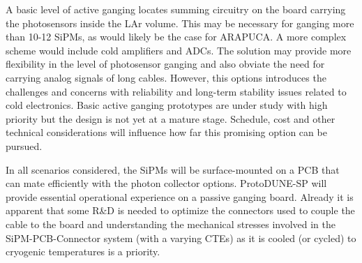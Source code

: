 A basic level of active ganging locates summing circuitry on the board carrying the photosensors inside the LAr volume. This may be necessary for ganging more than 10-12 SiPMs, as would likely be the case for ARAPUCA. A more complex scheme would include cold amplifiers and ADCs.
The solution may provide more flexibility in the level of photosensor ganging and also obviate the need for carrying analog signals of long cables.
However, this options introduces the challenges and concerns with reliability and long-term
stability issues related to cold electronics.  Basic active ganging prototypes are under study with high priority 
but the design is not yet at a mature stage. Schedule, cost and other technical
considerations will influence how far this promising option can be pursued.

In all scenarios considered, the SiPMs will be surface-mounted on a PCB that can mate efficiently with the photon
collector options. ProtoDUNE-SP will provide essential operational experience on a passive ganging board. 
Already it is apparent that some R\&D is needed to optimize the connectors used to couple the cable to the board and understanding the 
mechanical stresses involved in the SiPM-PCB-Connector system (with a varying CTEs) as it is cooled (or cycled) to cryogenic temperatures is a priority.







